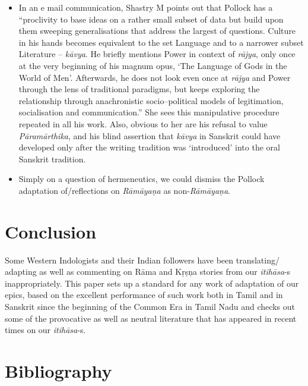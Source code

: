 \begin{itemize}
 \item In an e mail communication, Shastry M points out that Pollock has a “proclivity to base ideas on a rather small subset of data but build upon them sweeping generalisations that address the largest of questions. Culture in his hands becomes equivalent to the set Language and to a narrower subset Literature – \textit{kāvya}. He briefly mentions Power in context of \textit{rājya}, only once at the very beginning of his magnum opus, ‘The Language of Gods in the World of Men’. Afterwards, he does not look even once at \textit{rājya} and Power through the lens of traditional paradigms, but keeps exploring the relationship through anachronistic socio–political models of legitimation, socialisation and communication.” She sees this manipulative procedure repeated in all his work. Also, obvious to her are his refusal to value \textit{Pāramārthika}, and his blind assertion that \textit{kāvya} in Sanskrit could have developed only after the writing tradition was ‘introduced’ into the oral Sanskrit tradition.

 \item Simply on a question of hermeneutics, we could dismiss the Pollock adaptation of/reflections on \textit{Rāmāyaṇa} as non-\textit{Rāmāyaṇa}.

\end{itemize}



\section*{Conclusion}

Some Western Indologists and their Indian followers have been translating/ adapting as well as commenting on Rāma and Kṛṣņa stories from our \textit{itihāsa}-s inappropriately. This paper sets up a standard for any work of adaptation of our epics, based on the excellent performance of such work both in Tamil and in Sanskrit since the beginning of the Common Era in Tamil Nadu and checks out some of the provocative as well as neutral literature that has appeared in recent times on our \textit{itihāsa}-s.


\section*{Bibliography}

